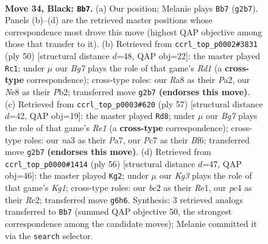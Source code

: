 \documentclass[11pt]{article}
\begin{document}
\clearpage

\begin{figure}[p]\centering
\begin{subfigure}{0.46\textwidth}\centering
\resizebox{\linewidth}{!}{%
\newchessgame
\chessboard[
  setfen={r3n3/p1pp4/1p4k1/5p1p/2P2P2/NP6/P1BPK1bP/R7 b - - 7 34},
  showmover=false,
  pgfstyle=straightmove, color=movearrow, markmove={g2-b7}
]}
\caption{}
\end{subfigure}\hfill
\begin{subfigure}{0.46\textwidth}\centering
\resizebox{\linewidth}{!}{%
\newchessgame
\chessboard[
  setfen={2r2k2/p1b1npp1/1p4p1/8/7P/4BN2/PP3PP1/3R1K2 w - - 1 26},
  showmover=false,
  pgfstyle=straightmove, color=movearrow, markmove={d1-c1}
]}
\caption{}
\end{subfigure}
\\[4pt]
\begin{subfigure}{0.46\textwidth}\centering
\resizebox{\linewidth}{!}{%
\newchessgame
\chessboard[
  setfen={4r3/pp3k2/5bp1/n1N1pp2/P1P5/2P5/1P3KPP/2BR4 b - - 4 29},
  showmover=false,
  pgfstyle=straightmove, color=movearrow, markmove={e8-d8}
]}
\caption{}
\end{subfigure}\hfill
\begin{subfigure}{0.46\textwidth}\centering
\resizebox{\linewidth}{!}{%
\newchessgame
\chessboard[
  setfen={7r/p2k2pp/1b2p3/3p4/P1n1p3/1NP3P1/2R2P1P/4R1K1 w - - 1 29},
  showmover=false,
  pgfstyle=straightmove, color=movearrow, markmove={g1-g2}
]}
\caption{}
\end{subfigure}
\caption{\textbf{Move 34, Black: \texttt{Bb7}.} (a) Our position; Melanie plays \texttt{Bb7} (\texttt{g2b7}). Panels (b)--(d) are the retrieved master positions whose correspondence most drove this move (highest QAP objective among those that transfer to it). (b) Retrieved from \texttt{ccrl\_top\_p0002\#3831} (ply 50) [structural distance $d$=48, QAP obj=22]: the master played \texttt{Rc1}; under $\mu$ our \emph{Bg7} plays the role of that game's \emph{Rd1} (a \textbf{cross-type} correspondence); cross-type roles: our \emph{R}a8 as their \emph{P}a2, our \emph{N}e8 as their \emph{P}b2; transferred move \texttt{g2b7} \textbf{(endorses this move)}. (c) Retrieved from \texttt{ccrl\_top\_p0003\#620} (ply 57) [structural distance $d$=42, QAP obj=19]: the master played \texttt{Rd8}; under $\mu$ our \emph{Bg7} plays the role of that game's \emph{Re1} (a \textbf{cross-type} correspondence); cross-type roles: our \emph{n}a3 as their \emph{P}a7, our \emph{P}c7 as their \emph{B}f6; transferred move \texttt{g2b7} \textbf{(endorses this move)}. (d) Retrieved from \texttt{ccrl\_top\_p0000\#1414} (ply 56) [structural distance $d$=47, QAP obj=46]: the master played \texttt{Kg2}; under $\mu$ our \emph{Kg3} plays the role of that game's \emph{Kg1}; cross-type roles: our \emph{b}c2 as their \emph{R}e1, our \emph{p}c4 as their \emph{R}c2; transferred move \texttt{g6h6}. Synthesis: 3 retrieved analogs transferred to \texttt{Bb7} (summed QAP objective 50, the strongest correspondence among the candidate moves); Melanie committed it via the \texttt{search} selector.}
\label{fig:thought-m67}
\end{figure}
\end{document}
